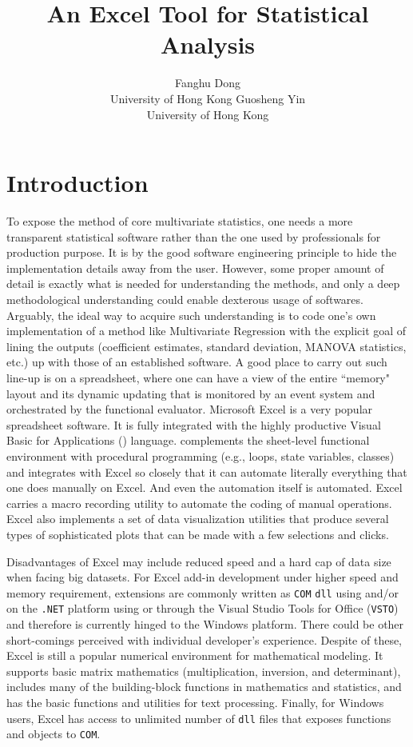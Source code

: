 \documentclass[article]{jss}
\author{Fanghu Dong\\University of Hong Kong \And Guosheng Yin\\University of Hong Kong}
\title{An Excel Tool for Statistical Analysis}
\numberwithin{equation}{subsection}
\begin{document}
  
  
  
  
  
    \section[intro]{Introduction}
        To expose the method of core multivariate statistics, one needs a more transparent statistical software rather than the one used by professionals for production purpose. It is by the good software engineering principle to hide the implementation details away from the user. However, some proper amount of detail is exactly what is needed for understanding the methods, and only a deep methodological understanding could enable dexterous usage of softwares. Arguably, the ideal way to acquire such understanding is to code one's own implementation of a method like Multivariate Regression with the explicit goal of lining the outputs (coefficient estimates, standard deviation, MANOVA statistics, etc.) up with those of an established software. A good place to carry out such line-up is on a spreadsheet, where one can have a view of the entire ``memory" layout and its dynamic updating that is monitored by an event system and orchestrated by the functional evaluator. Microsoft Excel is a very popular spreadsheet software. It is fully integrated with the highly productive Visual Basic for Applications () language.  complements the sheet-level functional environment with procedural programming (e.g., loops, state variables, classes) and integrates with Excel so closely that it can automate literally everything that one does manually on Excel. And even the automation itself is automated. Excel carries a macro recording utility to automate the coding of manual operations. Excel also implements a set of data visualization utilities that produce several types of sophisticated plots that can be made with a few selections and clicks.
  
  
        Disadvantages of Excel may include reduced speed and a hard cap of data size when facing big datasets. For Excel add-in development under higher speed and memory requirement, extensions are commonly written as \texttt{COM} \texttt{dll} using   and/or on the \texttt{.NET} platform using  or  through the Visual Studio Tools for Office (\texttt{VSTO}) and therefore is currently hinged to the Windows platform. There could be other short-comings perceived with individual developer's experience. Despite of these, Excel is still a popular numerical environment for mathematical modeling. It supports basic matrix mathematics (multiplication, inversion, and determinant), includes many of the building-block functions in mathematics and statistics, and has the basic functions and utilities for text processing. Finally, for Windows users, Excel has access to unlimited number of \texttt{dll} files that exposes functions and objects to \texttt{COM}.
  
\end{document}
